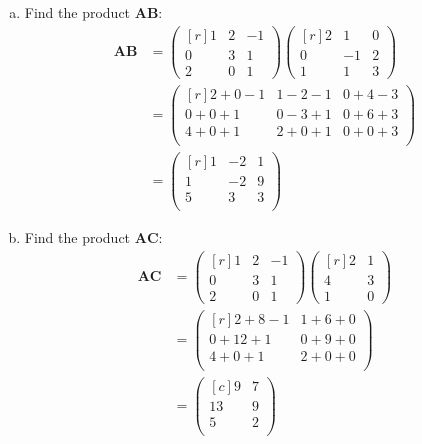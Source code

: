 \documentclass{article}
\begin{document}
\begin{multicols}{2}
\begin{enumerate}[(a)]
    \item Find the product $\mathbf{AB}$:
    \[
        \begin{aligned}
        \mathbf{AB} &= 
        \begin{pmatrix*}[r]
        1 & 2 & -1 \\
        0 & 3 & 1 \\
        2 & 0 & 1
        \end{pmatrix*} 
        \begin{pmatrix*}[r]
        2 & 1 & 0 \\
        0 & -1 & 2 \\
        1 & 1 & 3
        \end{pmatrix*} \\
        & = 
        \begin{pmatrix*}[r]
        2+0-1 & 1-2-1 & 0+4-3 \\
        0+0+1 & 0-3+1 & 0+6+3 \\
        4+0+1 & 2+0+1 & 0+0+3 \\
        \end{pmatrix*} \\
        & = 
        \begin{pmatrix*}[r]
        1 & -2 & 1 \\
        1 & -2 & 9 \\
        5 & 3 & 3 \\
        \end{pmatrix*}
        \end{aligned}
    \]

    \item Find the product $\mathbf{AC}$:
    \[
        \begin{aligned}
        \mathbf{AC} &= 
        \begin{pmatrix*}[r]
        1 & 2 & -1 \\
        0 & 3 & 1 \\
        2 & 0 & 1
        \end{pmatrix*} 
        \begin{pmatrix*}[r]
        2 & 1 \\
        4 & 3 \\
        1 & 0
        \end{pmatrix*} \\
        & = 
        \begin{pmatrix*}[r]
        2+8-1 & 1+6+0 \\
        0+12+1 & 0+9+0 \\
        4+0+1 & 2+0+0 \\
        \end{pmatrix*} \\
        & = 
        \begin{pmatrix*}[c]
        9 & 7 \\
        13 & 9 \\
        5 & 2 \\
        \end{pmatrix*}
        \end{aligned}
    \]


\end{enumerate}
\end{multicols}
\end{document}
